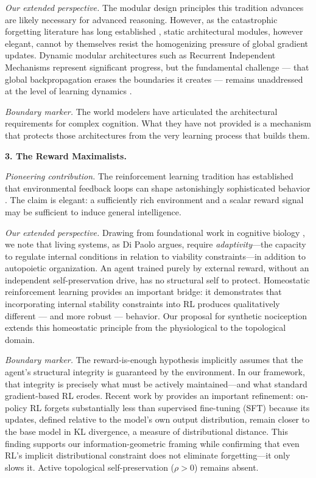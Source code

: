 \documentclass{article}
\begin{document}
\emph{Our extended perspective.} The modular design principles this tradition advances are likely necessary for advanced reasoning. However, as the catastrophic forgetting literature has long established \citep{French1999catastrophic}, static architectural modules, however elegant, cannot by themselves resist the homogenizing pressure of global gradient updates. Dynamic modular architectures such as Recurrent Independent Mechanisms \citep{Goyal2021RIMs} represent significant progress, but the fundamental challenge — that global backpropagation erases the boundaries it creates — remains unaddressed at the level of learning dynamics \citep{GoyalBengio2022}.

\emph{Boundary marker.} The world modelers have articulated the architectural requirements for complex cognition. What they have not provided is a mechanism that protects those architectures from the very learning process that builds them.

\bigskip
\noindent\textbf{3. The Reward Maximalists.}

\emph{Pioneering contribution.} The reinforcement learning tradition has established that environmental feedback loops can shape astonishingly sophisticated behavior \citep{Silver2021reward,Mnih2015humanlevel,Silver2016alphago}. The claim is elegant: a sufficiently rich environment and a scalar reward signal may be sufficient to induce general intelligence.

\emph{Our extended perspective.} Drawing from foundational work in cognitive biology \citep{DiPaolo2005}, we note that living systems, as Di Paolo argues, require \emph{adaptivity}---the capacity to regulate internal conditions in relation to viability constraints---in addition to autopoietic organization. An agent trained purely by external reward, without an independent self-preservation drive, has no structural self to protect. Homeostatic reinforcement learning \citep{Keramati2014} provides an important bridge: it demonstrates that incorporating internal stability constraints into RL produces qualitatively different — and more robust — behavior. Our proposal for synthetic nociception extends this homeostatic principle from the physiological to the topological domain.

\emph{Boundary marker.} The reward-is-enough hypothesis implicitly assumes that the agent's structural integrity is guaranteed by the environment. In our framework, that integrity is precisely what must be actively maintained---and what standard gradient-based RL erodes. Recent work by \citet{Shenfeld2025RLRazor} provides an important refinement: on-policy RL forgets substantially less than supervised fine-tuning (SFT) because its updates, defined relative to the model's own output distribution, remain closer to the base model in KL divergence, a measure of distributional distance. This finding supports our information-geometric framing while confirming that even RL's implicit distributional constraint does not eliminate forgetting---it only slows it. Active topological self-preservation ($\rho > 0$) remains absent.
\end{document}
